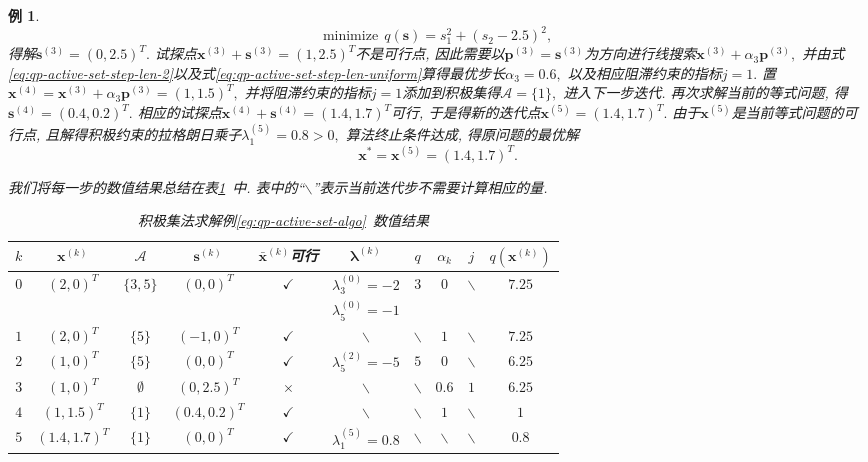 \documentclass{SBCbookchapter}
\newcommand{\V}[1]{{\bm{#1}}}
\newtheorem{eg}[thm]{例}
\numberwithin{equation}{section}
\begin{document}
\begin{eg}
\begin{equation*}
\text{minimize} ~~ q(\V{s}) = s_1^2 + (s_2 - 2.5)^2,
\end{equation*}
得解$\V{s}^{(3)} = (0, 2.5)^T.$ 试探点$\V{x}^{(3)} + \V{s}^{(3)} = (1, 2.5)^T$不是可行点, 因此需要以$\V{p}^{(3)} = \V{s}^{(3)}$为方向进行线搜索$\V{x}^{(3)} + \alpha_3 \V{p}^{(3)},$ 并由式\eqref{eq:qp-active-set-step-len-2}以及式\eqref{eq:qp-active-set-step-len-uniform}算得最优步长$\alpha_3 = 0.6,$ 以及相应阻滞约束的指标$j = 1.$ 置$\V{x}^{(4)} = \V{x}^{(3)} + \alpha_3 \V{p}^{(3)} = (1, 1.5)^T,$ 并将阻滞约束的指标$j = 1$添加到积极集得$\mathcal{A} = \{ 1 \},$ 进入下一步迭代. 再次求解当前的等式问题, 得$\V{s}^{(4)} = (0.4, 0.2)^T.$ 相应的试探点$\V{x}^{(4)} + \V{s}^{(4)} = (1.4, 1.7)^T$可行, 于是得新的迭代点$\V{x}^{(5)} = (1.4, 1.7)^T.$ 由于$\V{x}^{(5)}$是当前等式问题的可行点, 且解得积极约束的拉格朗日乘子$\lambda_1^{(5)} = 0.8 > 0,$ 算法终止条件达成, 得原问题的最优解
\begin{equation*}
\V{x}^* = \V{x}^{(5)} = (1.4, 1.7)^T.
\end{equation*}

我们将每一步的数值结果总结在表\ref{tab:active-set-eg}~中. 表中的``$\backslash$''表示当前迭代步不需要计算相应的量.

\begin{table}[H]
    \caption{积极集法求解例\ref{eg:qp-active-set-algo}~数值结果}
    \label{tab:active-set-eg}
    \centering
    \begin{tabular}{cccccccccc}
    \hline
    $k$ & $\V{x}^{(k)}$ & $\mathcal{A}$ & $\V{s}^{(k)}$ & $\bar{\V{x}}^{(k)}$可行 & $\V{\lambda}^{(k)}$ & $q$ & $\alpha_k$ & $j$ & $q(\V{x}^{(k)})$ \\
    \hline
    \multirow{2}{*}{$0$} & \multirow{2}{*}{$(2, 0)^T$} & \multirow{2}{*}{$\{ 3, 5 \}$} & \multirow{2}{*}{$(0, 0)^T$} & \multirow{2}{*}{$\checkmark$} & $\lambda_3^{(0)} = -2$ & \multirow{2}{*}{$3$} & \multirow{2}{*}{$0$} & \multirow{2}{*}{$\backslash$} & \multirow{2}{*}{$7.25$} \\
    & & & & & $\lambda_5^{(0)} = -1$ & & & \\
    $1$ & $(2, 0)^T$ & $\{ 5 \}$ & $(-1, 0)^T$ & $\checkmark$ & $\backslash$ & $\backslash$ & $1$ & $\backslash$ & $7.25$ \\
    $2$ & $(1, 0)^T$ & $\{ 5 \}$ & $(0, 0)^T$ & $\checkmark$ & $\lambda_5^{(2)} = -5$ & $5$ & $0$ & $\backslash$ & $6.25$ \\
    $3$ & $(1, 0)^T$ & $\emptyset$ & $(0, 2.5)^T$ & $\times$ & $\backslash$ & $\backslash$ & $0.6$ & $1$ & $6.25$ \\
    $4$ & $(1, 1.5)^T$ & $\{ 1 \}$ & $(0.4, 0.2)^T$ & $\checkmark$ & $\backslash$ & $\backslash$ & $1$ & $\backslash$ & $1$ \\
    $5$ & $(1.4, 1.7)^T$ & $\{ 1 \}$ & $(0, 0)^T$ & $\checkmark$ & $\lambda_1^{(5)} = 0.8$ & $\backslash$ & $\backslash$ & $\backslash$ & $0.8$ \\
    \hline
    \end{tabular}
\end{table}
\end{eg}
\end{document}
